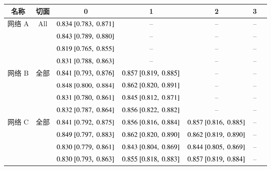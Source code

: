 \renewcommand{\captiontitle}{网络性能评估}
\begin{sidewaystable*}
\begin{center}
\begin{tabular}{ccccccc} \hline
\toprule
名称      & 切面   & \UNet{} 0                 & \UNet{} 1                 & \UNet{} 2                 & \UNet{} 3                 \\
\midrule
网络 A & All    & $0.834~[0.783,~0.871]$ & --                        & --                        & --                        \\
          & \SA{}  & $0.843~[0.789,~0.880]$ & --                        & --                        & --                        \\
          & \HLA{} & $0.819~[0.765,~0.855]$ & --                        & --                        & --                        \\
          & \VLA{} & $0.831~[0.788,~0.863]$ & --                        & --                        & --                        \\
\midrule
网络 B & 全部    & $0.841~[0.793,~0.876]$ & $0.857~[0.819,~0.885]$ & --                        & --                        \\
          & \SA{}  & $0.848~[0.800,~0.884]$ & $0.862~[0.820,~0.891]$ & --                        & --                        \\
          & \HLA{} & $0.831~[0.780,~0.861]$ & $0.845~[0.812,~0.871]$ & --                        & --                        \\
          & \VLA{} & $0.832~[0.787,~0.864]$ & $0.856~[0.822,~0.882]$ & --                        & --                        \\
\midrule
网络 C & 全部    & $0.841~[0.792,~0.875]$ & $0.856~[0.816,~0.884]$ & $0.857~[0.816,~0.885]$ & --                        \\
          & \SA{}  & $0.849~[0.797,~0.883]$ & $0.862~[0.820,~0.890]$ & $0.862~[0.819,~0.890]$ & --                        \\
          & \HLA{} & $0.830~[0.779,~0.861]$ & $0.843~[0.804,~0.869]$ & $0.844~[0.805,~0.869]$ & --                        \\
          & \VLA{} & $0.830~[0.793,~0.863]$ & $0.855~[0.818,~0.883]$ & $0.857~[0.819,~0.884]$ & --                        \\

\end{tabular}
\end{center}
\end{sidewaystable*}
